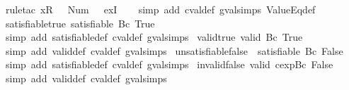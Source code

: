 \begin{isabellebody}
\ {\isacharparenleft}rule{\isacharunderscore}tac\ x{\isacharequal}{\isachardoublequoteopen}{\isacharless}R\ {}\ {\isacharcolon}{\isacharequal}\ Num\ {}{\isachargreater}{\isachardoublequoteclose}\ \ exI{\isacharparenright}\isanewline
\ \ \isamarkupfalse%
\ {\isacharparenleft}simp\ add{\isacharcolon}\ cval{\isacharunderscore}def\ gval{\isachardot}simps\ ValueEq{\isacharunderscore}def{\isacharparenright}%
\endisatagproof
{\isafoldproof}%
%
\isadelimproof
\isanewline
%
\endisadelimproof
\isanewline
{}\isamarkupfalse%
\ satisfiable{\isacharunderscore}true{\isacharcolon}\ {\isachardoublequoteopen}satisfiable\ {\isacharparenleft}Bc\ True{\isacharparenright}{\isachardoublequoteclose}\isanewline
%
\isadelimproof
\ \ %
\endisadelimproof
%
\isatagproof
{}\isamarkupfalse%
\ {\isacharparenleft}simp\ add{\isacharcolon}\ satisfiable{\isacharunderscore}def\ cval{\isacharunderscore}def\ gval{\isachardot}simps{\isacharparenright}%
\endisatagproof
{\isafoldproof}%
%
\isadelimproof
\isanewline
%
\endisadelimproof
\isanewline
{}\isamarkupfalse%
\ valid{\isacharunderscore}true{\isacharcolon}\ {\isachardoublequoteopen}valid\ {\isacharparenleft}Bc\ True{\isacharparenright}{\isachardoublequoteclose}\isanewline
%
\isadelimproof
\ \ %
\endisadelimproof
%
\isatagproof
{}\isamarkupfalse%
\ {\isacharparenleft}simp\ add{\isacharcolon}\ valid{\isacharunderscore}def\ cval{\isacharunderscore}def\ gval{\isachardot}simps{\isacharparenright}%
\endisatagproof
{\isafoldproof}%
%
\isadelimproof
\isanewline
%
\endisadelimproof
\isanewline
{}\isamarkupfalse%
\ unsatisfiable{\isacharunderscore}false{\isacharcolon}\ {\isachardoublequoteopen}{\isasymnot}\ satisfiable\ {\isacharparenleft}Bc\ False{\isacharparenright}{\isachardoublequoteclose}\isanewline
%
\isadelimproof
\ \ %
\endisadelimproof
%
\isatagproof
{}\isamarkupfalse%
\ {\isacharparenleft}simp\ add{\isacharcolon}\ satisfiable{\isacharunderscore}def\ cval{\isacharunderscore}def\ gval{\isachardot}simps{\isacharparenright}%
\endisatagproof
{\isafoldproof}%
%
\isadelimproof
\isanewline
%
\endisadelimproof
\isanewline
{}\isamarkupfalse%
\ invalid{\isacharunderscore}false{\isacharcolon}\ {\isachardoublequoteopen}{\isasymnot}valid\ {\isacharparenleft}cexp{\isachardot}Bc\ False{\isacharparenright}{\isachardoublequoteclose}\isanewline
%
\isadelimproof
\ \ %
\endisadelimproof
%
\isatagproof
{}\isamarkupfalse%
\ {\isacharparenleft}simp\ add{\isacharcolon}\ valid{\isacharunderscore}def\ cval{\isacharunderscore}def\ gval{\isachardot}simps{\isacharparenright}%

\end{isabellebody}
